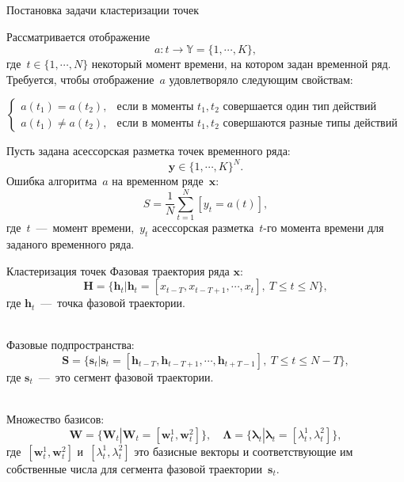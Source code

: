 \documentclass[10pt,pdf,hyperref={unicode}]{beamer}
\begin{document}
\begin{frame}[shrink=5]{Постановка задачи кластеризации точек}

Рассматривается отображение
$$
a : t \to \mathbb{Y} = \{1,\cdots, K\}, 
$$
где~$t \in \{1,\cdots, N\}$ некоторый момент времени, на котором задан временной ряд.
Требуется, чтобы отображение~$a$ удовлетворяло следующим свойствам:

$$
\begin{cases}
    a\left(t_1\right) = a\left(t_2\right), &  \text{если в моменты } t_1, t_2 \text{ совершается один тип действий}\\
    a\left(t_1\right) \not= a\left(t_2\right), &  \text{если в моменты } t_1, t_2 \text{ совершаются разные типы действий }
\end{cases}
$$

Пусть задана асессорская разметка точек временного ряда:
$$
\textbf{y} \in \{1,\cdots,K\}^{N}.
$$
Ошибка алгоритма~$a$ на временном ряде~$\textbf{x}$:
$$
S = \frac{1}{N}\sum_{t=1}^{N}[y_t = a\left(t\right)],
$$
где~$t$~---~момент времени,~$y_t$ асессорская разметка~$t$-го момента времени для заданого временного ряда.

\end{frame}
\begin{frame}{Кластеризация точек}
Фазовая траектория ряда $\textbf{x}$:
$$\mathbf{H} = \{\textbf{h}_t| \textbf{h}_t = [x_{t-T}, x_{t-T+1}, \cdots, x_{t}],~T\leq t\leq N\},$$
где $\textbf{h}_t$~---~точка фазовой траектории.

~\\
Фазовые подпространства:
$$\mathbf{S} = \{\textbf{s}_t| \textbf{s}_t = [\textbf{h}_{t-T}, \textbf{h}_{t-T+1}, \cdots, \textbf{h}_{t+T-1}],~T\leq t\leq N-T\},$$
где $\textbf{s}_t$~---~это сегмент фазовой траектории.

~\\
Множество базисов:
$$\mathbf{W} = \{\textbf{W}_t| \textbf{W}_t = [\textbf{w}^1_t, \textbf{w}^2_t]\}, \quad \bm{\Lambda} = \{\bm{\lambda}_t| \bm{\lambda}_t=[\lambda^1_t, \lambda^2_t]\},$$
где~$[\textbf{w}^1_t, \textbf{w}^2_t]$ и~$[\lambda^1_t, \lambda^2_t]$ это базисные векторы и соответствующие им собственные числа для сегмента фазовой траектории~$\textbf{s}_t$.
\end{frame}
\end{document}
